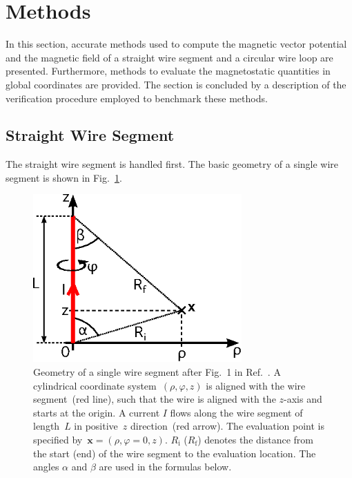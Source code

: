 \section{Methods}
\label{sec:methods}
In this section, accurate methods used to compute the magnetic vector potential and the magnetic field
of a straight wire segment and a circular wire loop are presented.
Furthermore, methods to evaluate the magnetostatic quantities in global coordinates are provided.
The section is concluded by a description of the verification procedure
employed to benchmark these methods.

\subsection{Straight Wire Segment}
\label{sec:methods_sws}
The straight wire segment is handled first.
The basic geometry of a single wire segment is shown in Fig.~\ref{fig:straightWireSegment}.
\begin{figure}[htbp]
 \centering
 \includegraphics[width=8cm]{img/straightWireSegment.eps}
 \caption{Geometry of a single wire segment after Fig.~1 in Ref.~\cite{hanson_hirshman_2002}.
          A cylindrical coordinate system~$(\rho, \varphi,z)$ is aligned with the wire segment~(red line),
          such that the wire is aligned with the $z$-axis and starts at the origin.
          A current $I$ flows along the wire segment of length~$L$ in positive~$z$ direction~(red arrow).
          The evaluation point is specified by~$\mathbf{x} = (\rho, \varphi=0, z)$.
          $R_\mathrm{i}$ ($R_\mathrm{f}$) denotes the distance from the start (end) of the wire segment to the evaluation location.
          The angles $\alpha$ and $\beta$ are used in the formulas below.}
 \label{fig:straightWireSegment}
\end{figure}

